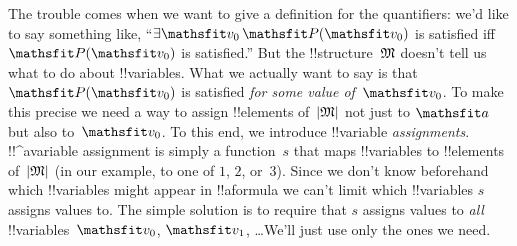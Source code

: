\documentclass[../../../include/open-logic-section]{subfiles}
\begin{document}
The trouble comes when we want to give a definition for the
quantifiers: we'd like to say something like, ``$\lexists[\Obj
v_0][\Atom{\Obj P}{\Obj v_0}]$ is satisfied iff $\Atom{\Obj P}{\Obj
v_0}$ is satisfied.'' But the !!{structure}~$\Struct{M}$ doesn't tell
us what to do about !!{variable}s. What we actually want to say is
that $\Atom{\Obj P}{\Obj v_0}$ is satisfied \emph{for some value
of~$\Obj v_0$}.  To make this precise we need a way to assign
!!{element}s of~$\Domain{M}$ not just to $\Obj a$ but also to~$\Obj
v_0$. To this end, we introduce !!{variable} \emph{assignments}.
!!^a{variable} assignment is simply a function~$s$ that maps
!!{variable}s to !!{element}s of~$\Domain{M}$ (in our example, to one
of $1$, $2$, or~$3$).  Since we don't know beforehand which
!!{variable}s might appear in !!a{formula} we can't limit which
!!{variable}s $s$ assigns values to. The simple solution is to
require that $s$ assigns values to \emph{all} !!{variable}s~$\Obj
v_0$, $\Obj v_1$, \dots\@ We'll just use only the ones we need.
\end{document}

